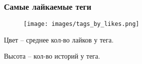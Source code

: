 \documentclass[14pt]{beamer}
\begin{document}
\begin{frame}[fragile]
	
	\frametitle{Самые лайкаемые теги}
	
	\begin{figure}
		\texttt{[image: images/tags\_by\_likes.png]}
	\end{figure}

	Цвет -- среднее кол-во лайков у тега.
	
	Высота -- кол-во историй у тега.
	
\end{frame}


\begin{frame}
\end{frame}
\end{document}
